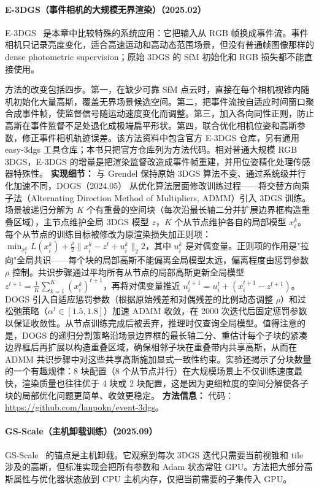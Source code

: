\paragraph{E-3DGS（事件相机的大规模无界渲染）（2025.02）}
E-3DGS~\cite{2502_10827} 是本章中比较特殊的系统应用：它把输入从 RGB 帧换成事件流。事件相机只记录亮度变化，适合高速运动和高动态范围场景，但没有普通帧图像那样的 dense photometric supervision；原始 3DGS 的 SfM 初始化和 RGB 损失都不能直接使用。

方法的改变包括四步。第一，在缺少可靠 SfM 点云时，直接在每个相机视锥内随机初始化大量高斯，覆盖无界场景候选空间。第二，把事件流按自适应时间窗口聚合成事件帧，使监督信号随运动速度变化而调整。第三，加入各向同性正则，防止高斯在事件监督不足处退化成极端扁平形状。第四，联合优化相机位姿和高斯参数，修正事件相机轨迹误差。该方法资料中包含官方 E-3DGS 仓库，另有通用 easy-3dgs 工具仓库；本书只把官方仓库列为方法代码。相对普通大规模 RGB 3DGS，E-3DGS 的增量是把渲染监督改造成事件帧重建，并用位姿精化处理传感器特殊性。
\textbf{实现细节：} 与 Grendel 保持原始 3DGS 算法不变、通过系统级并行化加速不同，DOGS（2024.05） 从优化算法层面修改训练过程——将交替方向乘子法（Alternating Direction Method of Multipliers, ADMM）引入 3DGS 训练。场景被递归分解为 $K$ 个有重叠的空间块（每次沿最长轴二分并扩展边界框构造重叠区域），主节点维护全局 3DGS 模型 $z$，$K$ 个从节点维护各自的局部模型 $x_i^k$。每个从节点的训练目标被修改为原渲染损失加正则项：$\min_{x_i^k} L(x_i^k) + \frac{\rho}{2}\|x_i^k - z^t + u_i^k\|_2^{}2$，其中 $u_i^k$ 是对偶变量。正则项的作用是"拉向"全局共识——每个块的局部高斯不能偏离全局模型太远，偏离程度由惩罚参数 $\rho$ 控制。共识步骤通过平均所有从节点的局部高斯更新全局模型 $z^{t+1} = \frac{1}{K}\sum_{k=1}^{K}(x_i^k)^{t+1}$，再将对偶变量推近 $u_i^{t+1} = u_i^t + (x_i^{t+1} - z^{t+1})$。DOGS 引入自适应惩罚参数（根据原始残差和对偶残差的比例动态调整 $\rho$）和过松弛策略（$\alpha^t \in [1.5, 1.8]$）加速 ADMM 收敛，在 2000 次迭代后固定惩罚参数以保证收敛性。从节点训练完成后被丢弃，推理时仅查询全局模型。值得注意的是，DOGS 的递归分割策略沿场景边界框的最长轴二分、重估计每个子块的紧凑边界框后再扩展以构造重叠区域，确保相邻子块在重叠带内共享高斯，从而在 ADMM 共识步骤中对这些共享高斯施加显式一致性约束。实验还揭示了分块数量的一个有趣规律：8 块配置（8 个从节点并行）在大规模场景上不仅训练速度最快，渲染质量也往往优于 4 块或 2 块配置，这是因为更细粒度的空间分解使各子块的局部优化问题更简单、收敛更稳定。
\textbf{方法信息：} 代码：\url{https://github.com/lanpokn/event-3dgs}。
\paragraph{GS-Scale（主机卸载训练）（2025.09）}
GS-Scale~\cite{2509_15645} 的锚点是主机卸载。它观察到每次 3DGS 迭代只需要当前视锥和 tile 涉及的高斯，但标准实现会把所有参数和 Adam 状态常驻 GPU。方法把大部分高斯属性与优化器状态放到 CPU 主机内存，仅把当前需要的子集传入 GPU。

